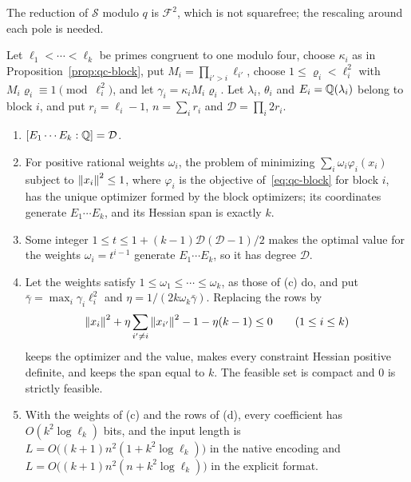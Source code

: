 The reduction of $\mathcal S$ modulo $q$ is $\mathcal F^2$, which is not
squarefree; the rescaling around each pole is needed.

\begin{theorem}
\label{thm:qc-blocks}
Let $\ell_1<\cdots<\ell_k$ be primes congruent to one modulo four, choose
$\kappa_i$ as in Proposition~\ref{prop:qc-block}, put
$M_i=\prod_{i'>i}\ell_{i'}$, choose $1\le\varrho_i<\ell_i^2$ with
$M_i\varrho_i\equiv1\pmod{\ell_i^2}$, and let $\gamma_i=\kappa_iM_i\varrho_i$.
Let $\lambda_i$, $\theta_i$ and $E_i=\mathbb Q(\lambda_i)$ belong to block $i$, and put
$r_i=\ell_i-1$, $n=\sum_ir_i$ and $\mathcal D=\prod_i2r_i$.
\begin{enumerate}[label=(\alph*),leftmargin=*]
\item $[E_1\cdots E_k:\mathbb Q]=\mathcal D$.
\item For positive rational weights $\omega_i$, the problem of minimizing
$\sum_i\omega_i\varphi_i(x_i)$ subject to $\left\lVert x_i\right\rVert^2\le1$, where
$\varphi_i$ is the objective of~\eqref{eq:qc-block} for block $i$, has the
unique optimizer formed by the block optimizers; its coordinates generate
$E_1\cdots E_k$, and its Hessian span is exactly $k$.
\item Some integer $1\le t\le1+(k-1)\mathcal D(\mathcal D-1)/2$ makes the
optimal value for the weights $\omega_i=t^{i-1}$ generate $E_1\cdots E_k$,
so it has degree $\mathcal D$.
\item Let the weights satisfy $1\le\omega_1\le\cdots\le\omega_k$, as those
of (c) do, and put $\bar\gamma=\max_i\gamma_i\ell_i^2$ and
$\eta=1/(2k\omega_k\bar\gamma)$. Replacing the rows by
\[
\left\lVert x_i\right\rVert^2+\eta\sum_{i'\ne i}\left\lVert x_{i'}\right\rVert^2-1-\eta(k-1)\le0\qquad(1\le i\le k)
\]
keeps the optimizer and the value, makes every constraint Hessian positive
definite, and keeps the span equal to $k$. The feasible set is compact and
$0$ is strictly feasible.
\item With the weights of (c) and the rows of (d), every coefficient has
$O(k^2\log\ell_k)$ bits, and the input length is
$L=O\bigl((k+1)n^2(1+k^2\log\ell_k)\bigr)$ in the native encoding and
$L=O\bigl((k+1)n^2(n+k^2\log\ell_k)\bigr)$ in the explicit format.
\end{enumerate}
\end{theorem}

